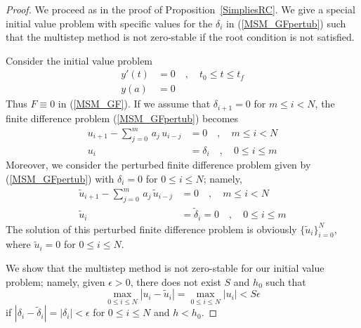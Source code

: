 \begin{proof}
We proceed as in the proof of Proposition~\ref{SimpliesRC}.
We give a special initial value problem with specific values for the
$\delta_i$ in (\ref{MSM_GFpertub}) such that the multistep method is
not zero-stable if the root condition is not satisfied.

Consider the initial value problem
\begin{align*}
y'(t) &= 0 \quad , \quad  t_0 \leq t \leq t_f\\
y(a) &= 0
\end{align*}
Thus $F \equiv 0$ in (\ref{MSM_GF}).
If we assume that $\delta_{i+1} = 0$ for $m \leq i < N$, the finite
difference problem (\ref{MSM_GFpertub}) becomes
\begin{equation} \label{zzFDPtwo}
\begin{split}
u_{i+1} - \sum_{j=0}^m\,a_j\,u_{i-j} &= 0 \quad, \quad m \leq i < N \\
u_i &= \delta_i \quad, \quad 0 \leq i \leq m
\end{split}
\end{equation}
Moreover, we consider the perturbed finite difference problem given by
(\ref{MSM_GFpertub}) with $\delta_i = 0$ for $0\leq i \leq N$; namely,
\[
\begin{split}
\tilde{u}_{i+1} - \sum_{j=0}^m\,a_j\,\tilde{u}_{i-j} &= 0 \quad,
\quad m \leq i < N \\
\tilde{u}_i &= \tilde{\delta}_i = 0 \quad, \quad 0 \leq i \leq m
\end{split}
\]
The solution of this perturbed finite difference problem is obviously
$\displaystyle \{ \tilde{u}_i \}_{i=0}^N$, where $\tilde{u}_i = 0$ for
$0 \leq i \leq N$.

We show that the multistep method is not zero-stable for our
initial value problem; namely, given $\epsilon>0$, there does not
exist $S$ and $h_0$ such that
\begin{equation} \label{test_S_RC}
\max_{0\leq i \leq N} |u_i - \tilde{u}_i | =
\max_{0\leq i \leq N} | u_i | < S\epsilon
\end{equation}
if $|\delta_i - \tilde{\delta}_i| = |\delta_i| < \epsilon$ for
$0 \leq i \leq N$ and $h<h_0$.


\end{proof}
